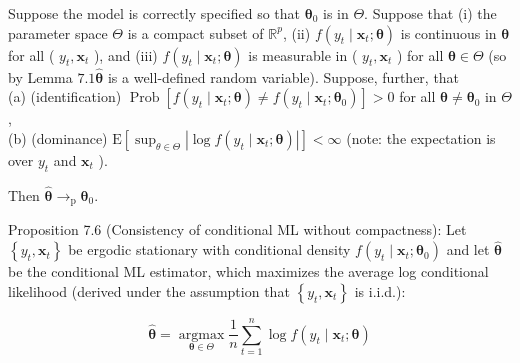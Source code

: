 \documentclass[10pt]{article}
\begin{document}
Suppose the model is correctly specified so that $\boldsymbol{\theta}_{0}$ is in $\Theta$. Suppose that (i) the parameter space $\Theta$ is a compact subset of $\mathbb{R}^{p}$, (ii) $f\left(y_{t} \mid \mathbf{x}_{t} ; \boldsymbol{\theta}\right)$ is continuous in $\boldsymbol{\theta}$ for all ( $y_{t}, \mathbf{x}_{t}$ ), and (iii) $f\left(y_{t} \mid \mathbf{x}_{t} ; \boldsymbol{\theta}\right)$ is measurable in ( $y_{t}, \mathbf{x}_{t}$ ) for all $\boldsymbol{\theta} \in \Theta$ (so by Lemma $7.1 \hat{\boldsymbol{\theta}}$ is a well-defined random variable). Suppose, further, that\\
(a) (identification) $\operatorname{Prob}\left[f\left(y_{t} \mid \mathbf{x}_{t} ; \boldsymbol{\theta}\right) \neq f\left(y_{t} \mid \mathbf{x}_{t} ; \boldsymbol{\theta}_{0}\right)\right]>0$ for all $\boldsymbol{\theta} \neq \boldsymbol{\theta}_{0}$ in $\Theta$,\\
(b) (dominance) $\mathrm{E}\left[\sup _{\theta \in \Theta}\left|\log f\left(y_{t} \mid \mathbf{x}_{t} ; \boldsymbol{\theta}\right)\right|\right]<\infty$ (note: the expectation is over $y_{t}$ and $\mathbf{x}_{t}$ ).

Then $\hat{\boldsymbol{\theta}} \rightarrow_{\mathrm{p}} \boldsymbol{\theta}_{0}$.

Proposition 7.6 (Consistency of conditional ML without compactness): Let $\left\{y_{t}, \mathbf{x}_{t}\right\}$ be ergodic stationary with conditional density $f\left(y_{t} \mid \mathbf{x}_{t} ; \boldsymbol{\theta}_{0}\right)$ and let $\hat{\boldsymbol{\theta}}$ be the conditional ML estimator, which maximizes the average log conditional likelihood (derived under the assumption that $\left\{y_{t}, \mathbf{x}_{t}\right\}$ is i.i.d.):

$$
\hat{\boldsymbol{\theta}}=\underset{\boldsymbol{\theta} \in \Theta}{\operatorname{argmax}} \frac{1}{n} \sum_{t=1}^{n} \log f\left(y_{t} \mid \mathbf{x}_{t} ; \boldsymbol{\theta}\right)
$$
\end{document}
